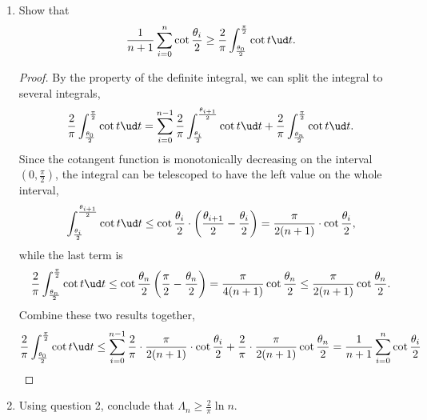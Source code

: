 \begin{enumerate}
\begin{enumerate}
		\begin{proof}
		We apply the substitution from the result of previous questions.
		\begin{align*}
		L_i(1)&=\frac{T_{n+1}(1)}{(1-x_i)T'_{n+1}(x_i)}\\
		&=\frac{1}{(1-\cos\theta_i)\cdot(-1)^i\frac{n+1}{\sin\theta_i}}\\
		&=\frac{(-1)^{-i}}{n+1}\cdot\frac{\sin\theta_i}{1-\cos\theta_i}	=\frac{(-1)^{-i}}{n+1}\cdot\cot\frac{\theta_i}{2}.
		\end{align*}
		So the sum of their absolute values has
		\[ \sum_{i=0}^n|L_i(1)|=\sum_{i=0}^n\left|\frac{(-1)^{-i}}{n+1}\cot\frac{\theta_i}{2}\right|=\frac{1}{n+1}\sum_{i=0}^{n}\left|\cot\frac{\theta_i}{2} \right|\geq\frac{1}{n+1}\sum_{i=0}^{n}\cot\frac{\theta_i}{2}. \]
		\end{proof}
	\end{enumerate}	
	\item Show that
	\[ \frac{1}{n+1}\sum_{i=0}^n\cot \frac{\theta_i}{2}\geq\frac{2}{\pi}\int_{\frac{\theta_0}{2}}^{\frac{\pi}{2}}\cot t \ud t. \]
	\begin{proof}
	By the property of the definite integral, we can split the integral to several integrals,
	\[ \frac{2}{\pi}\int_{\frac{\theta_0}{2}}^\frac{\pi}{2}\cot t\ud t=\sum_{i=0}^{n-1}\frac{2}{\pi}\int_{\frac{\theta_i}{2}}^\frac{\theta_{i+1}}{2}\cot t\ud t+\frac{2}{\pi}\int_{\frac{\theta_n}{2}}^\frac{\pi}{2}\cot t\ud t. \]
	Since the cotangent function is monotonically decreasing on the interval \(\left(0,\frac{\pi}{2}\right)\), the integral can be telescoped to have the left value on the whole interval,
	\[ \int_{\frac{\theta_i}{2}}^\frac{\theta_{i+1}}{2}\cot t\ud t\leq\cot\frac{\theta_i}{2}\cdot\left(\frac{\theta_{i+1}}{2}-\frac{\theta_{i}}{2}\right)=\frac{\pi}{2(n+1)}\cdot\cot\frac{\theta_i}{2}, \]
	while the last term is
	\[ \frac{2}{\pi}\int_{\frac{\theta_n}{2}}^\frac{\pi}{2}\cot t\ud t\leq\cot\frac{\theta_n}{2}\left(\frac{\pi}{2}-\frac{\theta_n}{2}\right)=\frac{\pi}{4(n+1)}\cot\frac{\theta_n}{2}\leq\frac{\pi}{2(n+1)}\cot\frac{\theta_n}{2}. \]
	Combine these two results together,
	\[ \frac{2}{\pi}\int_{\frac{\theta_0}{2}}^\frac{\pi}{2}\cot t\ud t\leq\sum_{i=0}^{n-1}\frac{2}{\pi}\cdot\frac{\pi}{2(n+1)}\cdot\cot\frac{\theta_i}{2}+\frac{2}{\pi}\cdot\frac{\pi}{2(n+1)}\cot\frac{\theta_n}{2}=\frac{1}{n+1}\sum_{i=0}^{n}\cot\frac{\theta_i}{2} \]
	\end{proof}
	\item Using question 2, conclude that \(\Lambda_n\geq\frac{2}{\pi}\ln n\).
\end{enumerate}

